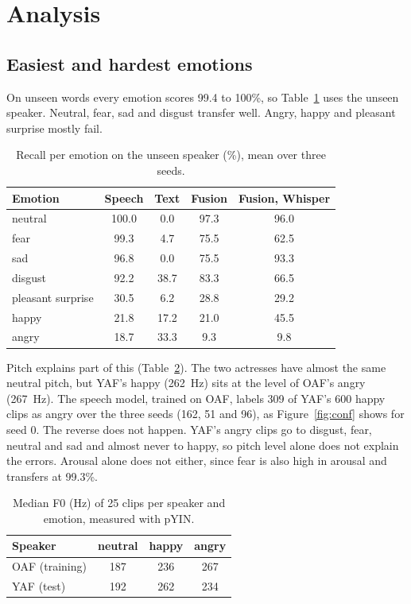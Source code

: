 \documentclass[11pt,a4paper]{article}
\begin{document}
\section{Analysis}

\subsection{Easiest and hardest emotions}

On unseen words every emotion scores 99.4 to 100\%, so Table~\ref{tab:emo} uses the unseen speaker. Neutral, fear,
sad and disgust transfer well. Angry, happy and pleasant surprise mostly fail.

\begin{table}[htbp]
\centering\small
\caption{Recall per emotion on the unseen speaker (\%), mean over three seeds.}
\label{tab:emo}
\begin{tabular}{lcccc}
\toprule
Emotion & Speech & Text & Fusion & Fusion, Whisper \\
\midrule
neutral & 100.0 & 0.0 & 97.3 & 96.0 \\
fear & 99.3 & 4.7 & 75.5 & 62.5 \\
sad & 96.8 & 0.0 & 75.5 & 93.3 \\
disgust & 92.2 & 38.7 & 83.3 & 66.5 \\
pleasant surprise & 30.5 & 6.2 & 28.8 & 29.2 \\
happy & 21.8 & 17.2 & 21.0 & 45.5 \\
angry & 18.7 & 33.3 & 9.3 & 9.8 \\
\bottomrule
\end{tabular}
\end{table}

Pitch explains part of this (Table~\ref{tab:f0}). The two actresses have almost the same neutral pitch, but YAF's happy
(262~Hz) sits at the level of OAF's angry (267~Hz). The speech model, trained on OAF, labels 309 of YAF's 600 happy
clips as angry over the three seeds (162, 51 and 96), as Figure~\ref{fig:conf} shows for seed 0. The reverse does not
happen. YAF's angry clips go to disgust, fear, neutral and sad and almost never to happy, so pitch level alone does not
explain the errors. Arousal alone does not either, since fear is also high in arousal and transfers at 99.3\%.

\begin{table}[htbp]
\centering\small
\caption{Median F0 (Hz) of 25 clips per speaker and emotion, measured with pYIN.}
\label{tab:f0}
\begin{tabular}{lccc}
\toprule
Speaker & neutral & happy & angry \\
\midrule
OAF (training) & 187 & 236 & 267 \\
YAF (test) & 192 & 262 & 234 \\
\bottomrule
\end{tabular}
\end{table}
\end{document}
